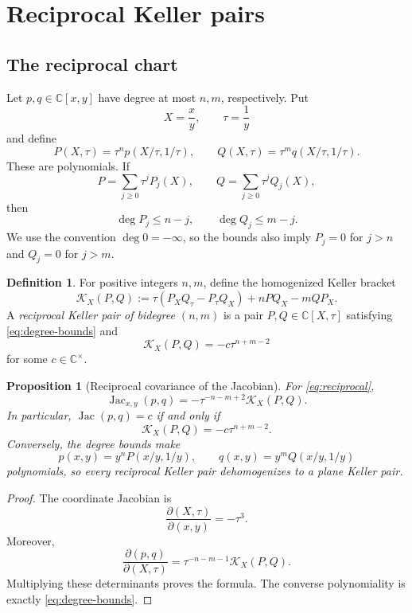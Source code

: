 \documentclass[11pt]{article}
\newtheorem{proposition}[theorem]{Proposition}
\theoremstyle{definition}
\newtheorem{definition}[theorem]{Definition}
\theoremstyle{remark}
\newcommand{\C}{\mathbb C}
\newcommand{\KX}{\mathcal K_X}
\newcommand{\Jac}{\operatorname{Jac}}
\begin{document}
\section{Reciprocal Keller pairs}

\subsection{The reciprocal chart}

Let \(p,q\in\C[x,y]\) have degree at most \(n,m\), respectively.  Put
\[
 X=\frac{x}{y},\qquad \tau=\frac1y
\]
and define
\begin{equation}
 P(X,\tau)=\tau^n p(X/\tau,1/\tau),\qquad
 Q(X,\tau)=\tau^m q(X/\tau,1/\tau).
\label{eq:reciprocal}
\end{equation}
These are polynomials.  If
\[
 P=\sum_{j\geq0}\tau^jP_j(X),\qquad
 Q=\sum_{j\geq0}\tau^jQ_j(X),
\]
then
\begin{equation}
 \deg P_j\leq n-j,\qquad
 \deg Q_j\leq m-j.
\label{eq:degree-bounds}
\end{equation}
We use the convention \(\deg0=-\infty\), so the bounds also imply
\(P_j=0\) for \(j>n\) and \(Q_j=0\) for \(j>m\).

\begin{definition}
For positive integers \(n,m\), define the homogenized Keller bracket
\begin{equation}
 \KX(P,Q)
 :=
 \tau(P_XQ_\tau-P_\tau Q_X)+nPQ_X-mQP_X.
\label{eq:kx}
\end{equation}
A \emph{reciprocal Keller pair of bidegree \((n,m)\)} is a pair
\(P,Q\in\C[X,\tau]\) satisfying \eqref{eq:degree-bounds} and
\[
 \KX(P,Q)=-c\tau^{n+m-2}
\]
for some \(c\in\C^\times\).
\end{definition}

\begin{proposition}[Reciprocal covariance of the Jacobian]
\label{prop:reciprocal}
For \eqref{eq:reciprocal},
\[
 \Jac_{x,y}(p,q)
 =-\tau^{-n-m+2}\KX(P,Q).
\]
In particular, \(\Jac(p,q)=c\) if and only if
\[
 \KX(P,Q)=-c\tau^{n+m-2}.
\]
Conversely, the degree bounds make
\[
 p(x,y)=y^nP(x/y,1/y),\qquad
 q(x,y)=y^mQ(x/y,1/y)
\]
polynomials, so every reciprocal Keller pair dehomogenizes to a plane
Keller pair.
\end{proposition}

\begin{proof}
The coordinate Jacobian is
\[
 \frac{\partial(X,\tau)}{\partial(x,y)}=-\tau^3.
\]
Moreover,
\[
 \frac{\partial(p,q)}{\partial(X,\tau)}
 =\tau^{-n-m-1}\KX(P,Q).
\]
Multiplying these determinants proves the formula.  The converse
polynomiality is exactly \eqref{eq:degree-bounds}.
\end{proof}
\end{document}
